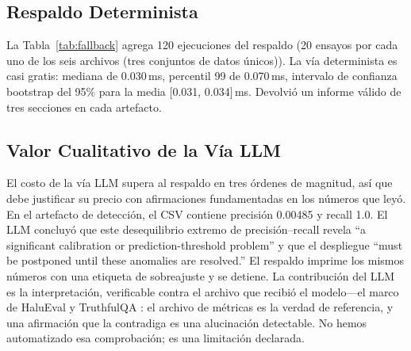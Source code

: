 \documentclass[10pt,twocolumn,letterpaper]{article}
\begin{document}
\subsection{Respaldo Determinista}
La Tabla~\ref{tab:fallback} agrega 120 ejecuciones del respaldo (20 ensayos por cada uno de los seis archivos (tres conjuntos de datos únicos)). La vía determinista es casi gratis: mediana de 0.030\,ms, percentil 99 de 0.070\,ms, intervalo de confianza bootstrap del 95\% para la media [0.031, 0.034]\,ms. Devolvió un informe válido de tres secciones en cada artefacto.

\begin{table}[htbp]
\centering
\caption{Respaldo determinista ($n=120$ ejecuciones sobre seis archivos (tres conjuntos de datos únicos))}
\label{tab:fallback}
\end{table}

\subsection{Valor Cualitativo de la Vía LLM}
El costo de la vía LLM supera al respaldo en tres órdenes de magnitud, así que debe justificar su precio con afirmaciones fundamentadas en los números que leyó. En el artefacto de detección, el CSV contiene precisión 0.00485 y recall 1.0. El LLM concluyó que este desequilibrio extremo de precisión--recall revela ``a significant calibration or prediction-threshold problem'' y que el despliegue ``must be postponed until these anomalies are resolved.'' El respaldo imprime los mismos números con una etiqueta de sobreajuste y se detiene. La contribución del LLM es la interpretación, verificable contra el archivo que recibió el modelo---el marco de HaluEval y TruthfulQA \cite{lihalu2023halu,lin2022truthfulqa}: el archivo de métricas es la verdad de referencia, y una afirmación que la contradiga es una alucinación detectable. No hemos automatizado esa comprobación; es una limitación declarada.
\end{document}
